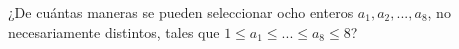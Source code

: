 ¿De cuántas maneras se pueden seleccionar ocho enteros $a_1,a_2, ... ,a_8$, no necesariamente distintos, tales que $1 \le a_1 \le ... \le a_8 \le 8$?
